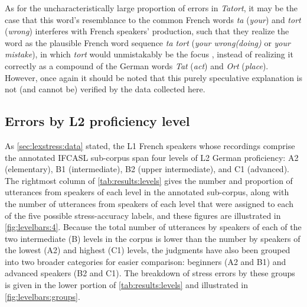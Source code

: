 			
			As for the uncharacteristically large proportion of errors in \textit{Tatort}, it may be the case that this word's resemblance to the common French words \textit{ta} (\textit{your}) and \textit{tort} (\textit{wrong}) interferes with French speakers' production, such that they realize the word as the plausible French word sequence \textit{ta tort} (\textit{your wrong(doing)} or \textit{your mistake}), in which \textit{tort} would unmistakably be the focus , instead of realizing it correctly as a compound of the German words \textit{Tat} (\textit{act}) and \textit{Ort} (\textit{place}).
			However, once again it should be noted that this
			purely speculative explanation is not (and cannot be) verified by the data collected here.  
			
			
			
		
		
		
		\subsection{Errors by L2 proficiency level}
		\label{sec:results:level}
		
		
		
			
			As \cref{sec:lexstress:data} stated, the L1 French speakers whose recordings comprise the annotated IFCASL sub-corpus span four levels of L2 German proficiency: A2 (elementary), B1 (intermediate), B2 (upper intermediate), and C1 (advanced). The rightmost column of \cref{tab:results:levels} gives the number and proportion of utterances from speakers of each level in the annotated sub-corpus, along with the number of utterances from speakers of each level that were assigned to each of the five possible stress-accuracy labels, and these figures are illustrated in \cref{fig:levelbars:4}. Because the total number of utterances by speakers of each of the two intermediate (B) levels in the corpus is lower than the number by speakers of the lowest (A2) and highest (C1) levels, the judgments have also been grouped into two broader categories for easier comparison: beginners (A2 and B1) and advanced speakers (B2 and C1). The breakdown of stress errors by these groups is given in the lower portion of \cref{tab:results:levels} and illustrated in \cref{fig:levelbars:groups}.
			
